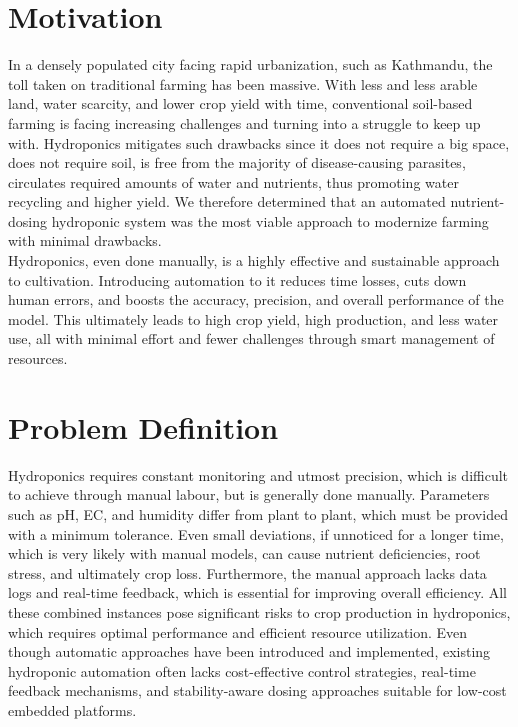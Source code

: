 \section{Motivation}
In a densely populated city facing rapid urbanization, such as Kathmandu, the toll taken on traditional farming has been massive. With less and less arable land, water scarcity, and lower crop yield with time, conventional soil-based farming is facing increasing challenges and turning into a struggle to keep up with. Hydroponics mitigates such drawbacks since it does not require a big space, does not require soil, is free from the majority of disease-causing parasites, circulates required amounts of water and nutrients, thus promoting water recycling and higher yield. We therefore determined that an automated nutrient-dosing hydroponic system was the most viable approach to modernize farming with minimal drawbacks.\\[10pt]
Hydroponics, even done manually, is a highly effective and sustainable approach to cultivation. Introducing automation to it reduces time losses, cuts down human errors, and boosts the accuracy, precision, and overall performance of the model. This ultimately leads to high crop yield, high production, and less water use, all with minimal effort and fewer challenges through smart management of resources.

\section{Problem Definition}
Hydroponics requires constant monitoring and utmost precision, which is difficult to achieve through manual labour, but is generally done manually. Parameters such as pH, EC, and humidity differ from plant to plant, which must be provided with a minimum tolerance. Even small deviations, if unnoticed for a longer time, which is very likely with manual models, can cause nutrient deficiencies, root stress, and ultimately crop loss. Furthermore, the manual approach lacks data logs and real-time feedback, which is essential for improving overall efficiency. All these combined instances pose significant risks to crop production in hydroponics, which requires optimal performance and efficient resource utilization. Even though automatic approaches have been introduced and implemented, existing hydroponic automation often lacks cost-effective control strategies, real-time feedback mechanisms, and stability-aware dosing approaches suitable for low-cost embedded platforms.

